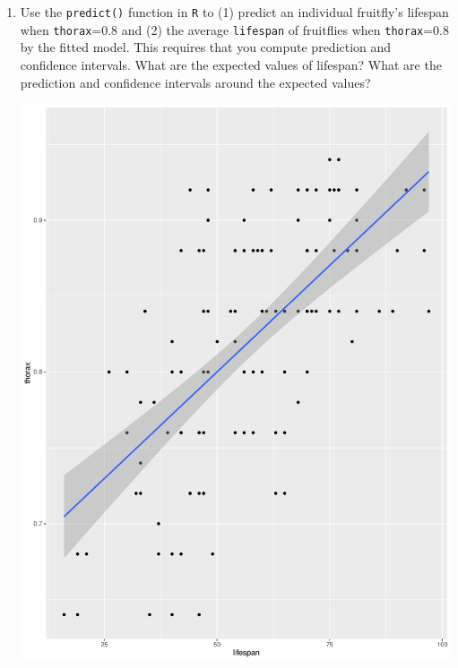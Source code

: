 \documentclass[12pt,letterpaper]{article}
\begin{document}
\begin{enumerate}
\begin{itemize}
	\end{itemize}
			\vspace{6cm}
	\item Use the \texttt{predict()} function in \texttt{R} to (1) predict an individual fruitfly's lifespan when \texttt{thorax}=0.8 and (2) the average \texttt{lifespan} of fruitflies when \texttt{thorax}=0.8 by the fitted model. This requires that you compute prediction and confidence intervals. What are the expected values of lifespan? What are the prediction and confidence intervals around the expected values? 
	
	\includegraphics{plot3-6}
			\vspace{6cm}
			

\end{enumerate}
\end{document}

